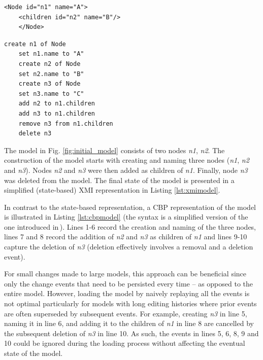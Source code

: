 \documentclass[12pt, a4paper]{report} \usepackage[titletoc]{appendix}
\begin{document}
\noindent
\begin{minipage}[t]{0.5\linewidth}
	\begin{lstlisting}[style=xmi,caption={State-based representation of the tree model in (simplified) XMI.},label=lst:xmimodel]
	<Node id="n1" name="A">
	<children id="n2" name="B"/>
	</Node>
	\end{lstlisting}
\end{minipage}
\hfill
\begin{minipage}[t]{0.5\linewidth}
	\begin{lstlisting}[style=eol,caption={Change-based representation of the tree model.},label=lst:cbpmodel]
	create n1 of Node
	set n1.name to "A"      
	create n2 of Node
	set n2.name to "B"      
	create n3 of Node
	set n3.name to "C"      
	add n2 to n1.children   
	add n3 to n1.children
	remove n3 from n1.children   
	delete n3
	\end{lstlisting}
\end{minipage}

The model in Fig. \ref{fig:initial_model} consists of two nodes \emph{n1}, \emph{n2}.
The construction of the model starts with creating and naming three nodes (\emph{n1}, \emph{n2} and \emph{n3}).
Nodes \emph{n2} and \emph{n3} were then added as children of \emph{n1}.
Finally, node \emph{n3} was deleted from the model.
The final state of the model is presented in a simplified (state-based) XMI representation in Listing \ref{lst:xmimodel}.

In contrast to the state-based representation, a CBP representation of the model is illustrated in Listing \ref{lst:cbpmodel} (the syntax is a simplified version of the one introduced in\,\cite{yohannis2017turning}). Lines 1-6 record the creation and naming of the three nodes, lines 7 and 8 record the addition of \emph{n2} and \emph{n3} as children of \emph{n1} and lines 9-10 capture the deletion of \emph{n3} (deletion effectively involves a removal and a deletion event).

For small changes made to large models, this approach can be beneficial since only the change events that need to be persisted every time -- as opposed to the entire model. However, loading the model by naively replaying all the events is not optimal particularly for models with long editing histories where prior events are often superseded by subsequent events. For example, creating \emph{n3} in line 5, naming it in line 6, and adding it to the children of \emph{n1} in line 8 are cancelled by the subsequent deletion of \emph{n3} in line 10. As such, the events in lines 5, 6, 8, 9 and 10 could be ignored during the loading process without affecting the eventual state of the model.
\end{document}
